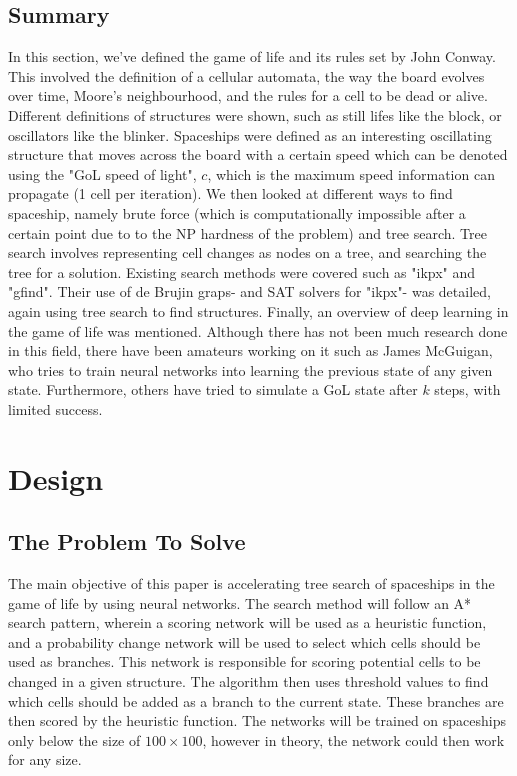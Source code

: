 \documentclass{l4proj}
\begin{document}
\section{Summary}

In this section, we've defined the game of life and its rules set by John Conway. This involved the definition of a cellular automata, the way the board evolves over time, Moore's neighbourhood, and the rules for a cell to be dead or alive. Different definitions of structures were shown, such as still lifes like the block, or oscillators like the blinker. Spaceships were defined as an interesting oscillating structure that moves across the board with a certain speed which can be denoted using the "GoL speed of light", $c$, which is the maximum speed information can propagate (1 cell per iteration). We then looked at different ways to find spaceship, namely brute force (which is computationally impossible after a certain point due to to the NP hardness of the problem) and tree search. Tree search involves representing cell changes as nodes on a tree, and searching the tree for a solution. Existing search methods were covered such as "ikpx" and "gfind". Their use of de Brujin graps- and SAT solvers for "ikpx"- was detailed, again using tree search to find structures. Finally, an overview of deep learning in the game of life was mentioned. Although there has not been much research done in this field, there have been amateurs working on it such as James McGuigan, who tries to train neural networks into learning the previous state of any given state. Furthermore, others have tried to simulate a GoL state after $k$ steps, with limited success.

\chapter{Design}

\section{The Problem To Solve}

The main objective of this paper is accelerating tree search of spaceships in the game of life by using neural networks. The search method will follow an A* search pattern, wherein a scoring network will be used as a heuristic function, and a probability change network will be used to select which cells should be used as branches. This network is responsible for scoring potential cells to be changed in a given structure. The algorithm then uses threshold values to find which cells should be added as a branch to the current state. These branches are then scored by the heuristic function. The networks will be trained on spaceships only below the size of $100 \times 100$, however in theory, the network could then work for any size.
\end{document}
